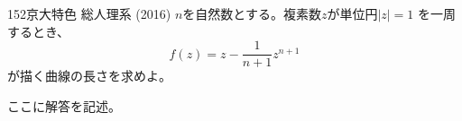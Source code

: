 \begin{thm}{152}{\maru}{京大特色 総人理系 (2016)}
 $n$を自然数とする。複素数$z$が単位円$|z|=1$ を一周するとき、
 \[ f(z) = z - \frac{1}{n+1}z^{n+1} \]
 が描く曲線の長さを求めよ。
\end{thm}

ここに解答を記述。